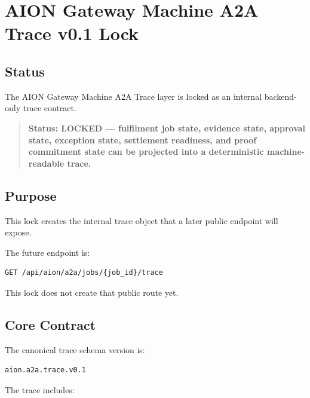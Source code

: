 \section{AION Gateway Machine A2A Trace v0.1 Lock}
\label{sec:aion-gateway-machine-a2a-trace-lock}

\subsection{Status}

The AION Gateway Machine A2A Trace layer is locked as an internal backend-only trace contract.

\begin{quote}
\textbf{Status: LOCKED --- fulfilment job state, evidence state, approval state, exception state, settlement readiness, and proof commitment state can be projected into a deterministic machine-readable trace.}
\end{quote}

\subsection{Purpose}

This lock creates the internal trace object that a later public endpoint will expose.

The future endpoint is:

\begin{verbatim}
GET /api/aion/a2a/jobs/{job_id}/trace
\end{verbatim}

This lock does not create that public route yet.

\subsection{Core Contract}

The canonical trace schema version is:

\begin{verbatim}
aion.a2a.trace.v0.1
\end{verbatim}

The trace includes:

